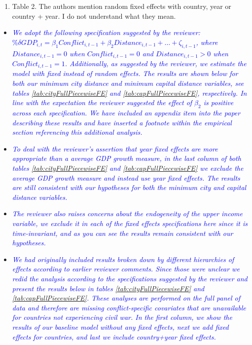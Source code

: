 \begin{enumerate}
\begin{enumerate}
	\item Table 2. The authors mention random fixed effects with country, year or country + year. I do not understand what they mean. \\
\end{enumerate}

\begin{itemize}
\item \textcolor{blue}{\emph{
	We adopt the following specification suggested by the reviewer: $\% \delta GDP_{i,t} = \beta_{1}Conflict_{i,t-1} + \beta_{2}Distance_{i,t-1}+\ldots+\zeta_{i,t-1}$, where $Distance_{i,t-1}=0$ when $Conflict_{i,t-1}=0$ and $Distance_{i,t-1}>0$ when $Conflict_{i,t-1}=1$. Additionally, as suggested by the reviewer, we estimate the model with fixed instead of random effects. The results are shown below for both our minimum city distance and minimum capital distance variables, see tables \ref{tab:cityFullPiecewiseFE} and \ref{tab:capFullPiecewiseFE}, respectively. In line with the expectation the reviewer suggested the effect of $\beta_{2}$ is positive across each specification. We have included an appendix item into the paper describing these results and have inserted a footnote within the empirical section referencing this additional analysis.
}} \\

\item \textcolor{blue}{\emph{
	To deal with the reviewer's assertion that year fixed effects are more appropriate than a average GDP growth measure, in the last column of both tables \ref{tab:cityFullPiecewiseFE} and \ref{tab:capFullPiecewiseFE} we exclude the average GDP growth measure and instead use year fixed effects. The results are still consistent with our hypotheses for both the minimum city and capital distance variables.
}} \\

\item \textcolor{blue}{\emph{
	The reviewer also raises concerns about the endogeneity of the upper income variable, we exclude it in each of the fixed effects specifications here since it is time-invariant, and as you can see the results remain consistent with our hypotheses.
}} \\

\item \textcolor{blue}{\emph{
	We had originally included results broken down by different hierarchies of effects according to earlier reviewer comments. Since those were unclear we redid the analysis according to the specifications suggested by the reviewer and present the results below in tables \ref{tab:cityFullPiecewiseFE} and \ref{tab:capFullPiecewiseFE}. These analyses are performed on the full panel of data and therefore are missing conflict-specific covariates that are unavailable for countries not experiencing civil war. In the first column, we show the results of our baseline model without any fixed effects, next we add fixed effects for countries, and last we include country+year fixed effects.
}} \\


\end{itemize}
\end{enumerate}
